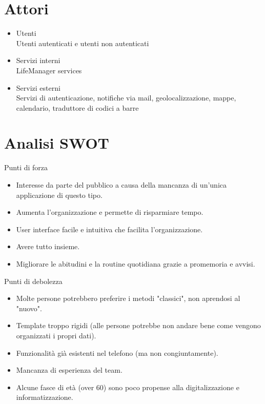 \documentclass[a4paper,12pt]{article}
\begin{document}
\section*{Attori}
\begin{itemize}
 \setlength\itemsep{0.01em}
\item {\sffamily  Utenti}
\\ Utenti autenticati e utenti non autenticati
\item {\sffamily  Servizi interni}
\\ LifeManager services
\item {\sffamily  Servizi esterni}
\\ Servizi di autenticazione, notifiche via mail, geolocalizzazione, mappe, calendario, traduttore di codici a barre

\end{itemize}

\section*{Analisi SWOT}
{\sffamily  Punti di forza}
\begin{itemize} \setlength\itemsep{0.01em}
\item Interesse da parte del pubblico a causa della mancanza di un'unica applicazione di questo tipo.
\item Aumenta l'organizzazione e permette di risparmiare tempo.
\item User interface facile e intuitiva che facilita l'organizzazione.
\item Avere tutto insieme.
\item Migliorare le abitudini e la routine quotidiana grazie a promemoria e avvisi.
\end{itemize}

{\sffamily  Punti di debolezza}
\begin{itemize} \setlength\itemsep{0.01em}
\item Molte persone potrebbero preferire i metodi "classici", non aprendosi al "nuovo".
\item Template troppo rigidi (alle persone potrebbe non andare bene come vengono organizzati i propri dati).
\item Funzionalità già esistenti nel telefono (ma non congiuntamente).
\item Mancanza di esperienza del team.
\item Alcune fasce di età (over 60) sono poco propense alla digitalizzazione e informatizzazione.
\end{itemize}
\end{document}
